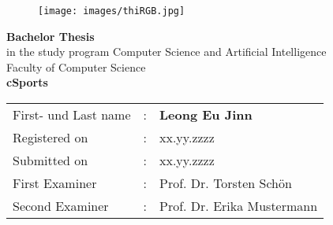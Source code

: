 

\begin{titlepage}	
		\begin{figure}[!h]
			\centering
			\texttt{[image: images/thiRGB.jpg]}	
		\end{figure}																			
	
	\begin{center}
		\hrulefill 
	\end{center}
	
	
	\begin{center}	
		\vspace{1cm}
		
		\huge\textbf{
			Bachelor Thesis}\\[2.5em]
		\normalsize
			in the study program Computer Science and Artificial Intelligence\\ Faculty of Computer Science	\\ [7em]
	
		\Large\textbf{cSports}	 \\ 

	\end{center}

	\vfill
	
	
	\begin{tabular}{lll}
		First- und Last name &: & \textbf{Leong Eu Jinn}	\\ [3em]
		
		Registered on &:	& xx.yy.zzzz	\\ [1em] %
		Submitted on &:	& xx.yy.zzzz	\\ [3em] %
		
		First Examiner &: 	& Prof. Dr. Torsten Schön	\\ [1em]
		Second Examiner &: 	& Prof. Dr. Erika Mustermann	\\[3em]
		
	\end{tabular}
	
\end{titlepage}

\restoregeometry